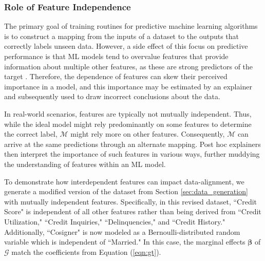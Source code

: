 \documentclass[12pt]{article}  %
\begin{document}
    
    \subsubsection{Role of Feature Independence}
        \label{sec:role_of_correlation}
        The primary goal of training routines for predictive machine learning algorithms is to construct a mapping from the inputs of a dataset to the outputs that correctly labels unseen data. However, a side effect of this focus on predictive performance is that ML models tend to overvalue features that provide information about multiple other features, as these are strong predictors of the target \citep{scholkopf2021toward}. Therefore, the dependence of features can skew their perceived importance in a model, and this importance may be estimated by an explainer and subsequently used to draw incorrect conclusions about the data.

        In real-world scenarios, features are typically not mutually independent. Thus, while the ideal model might rely predominantly on some features to determine the correct label, $\mathcal{M}$ might rely more on other features. Consequently, $\mathcal{M}$ can arrive at the same predictions through an alternate mapping.  Post hoc explainers then interpret the importance of such features in various ways, further muddying the understanding of features within an ML model.

         To demonstrate how interdependent features can impact data-alignment, we generate a modified version of the dataset from Section \ref{sec:data_generation} with mutually independent features. Specifically, in this revised dataset, ``Credit Score" is independent of all other features rather than being derived from ``Credit Utilization," ``Credit Inquiries," ``Delinquencies," and ``Credit History." Additionally, ``Cosigner"  is now modeled as a Bernoulli-distributed random variable which is independent of ``Married." In this case, the marginal effects $\boldsymbol{\beta}$ of $\mathcal{G}$ match the coefficients from Equation (\ref{eqn:gt}). %
        
\end{document}
